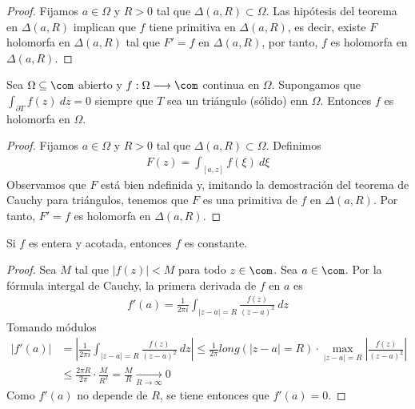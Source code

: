 \begin{proof}
Fijamos $a \in \Omega$ y $R > 0$ tal que $\Delta(a,R) \subset \Omega$. Las hipótesis del teorema en $\Delta(a,R)$ implican que $f$ tiene primitiva en $\Delta(a,R)$, es decir, existe $F$ holomorfa en $\Delta(a,R)$ tal que $F' = f$ en $\Delta(a,R)$, por tanto, $f$ es holomorfa en $\Delta(a,R)$.
\end{proof}

\begin{teo}
Sea $\Omega \subseteq \com$ abierto y $f: \Omega \longrightarrow \com$ continua en $\Omega$. Supongamos que $\int_{\partial T}{f(z) \ dz} = 0$ siempre que $T$ sea un triángulo (sólido) enn $\Omega$. Entonces $f$ es holomorfa en $\Omega$.
\end{teo}

\begin{proof}
Fijamos $a \in \Omega$ y $R > 0$ tal que $\Delta(a,R) \subset \Omega$. Definimos
\begin{align*}
    F(z) = \int_{[a,z]}{f(\xi) \ d\xi}
\end{align*}
Observamos que $F$ está bien ndefinida y, imitando la demostración del teorema de Cauchy para triángulos, tenemos que $F$ es una primitiva de $f$ en $\Delta(a,R)$. Por tanto, $F' = f$ es holomorfa en $\Delta(a,R)$.
\end{proof}

\begin{teo}[de Liouville]
Si $f$ es entera y acotada, entonces $f$ es constante.
\end{teo}

\begin{proof}
Sea $M$ tal que $|f(z)| < M$ para todo $z \in \com$. Sea $a \in \com$. Por la fórmula intergal de Cauchy, la primera derivada de $f$ en $a$ es
\begin{align*}
    f'(a) = \frac{1}{2\pi i}\int_{|z-a| = R}{\frac{f(z)}{(z-a)^2} \ dz}
\end{align*}
Tomando módulos
\begin{align*}
    |f'(a)| &= \left| \frac{1}{2\pi i}\int_{|z-a| = R}{\frac{f(z)}{(z-a)^2} \ dz} \right|  \leq \frac{1}{2\pi} long(|z-a| = R) \cdot \max_{|z-a| = R} \left| \frac{f(z)}{(z-a)^2} \right| \\
    & \leq \frac{2\pi R}{2\pi} \cdot \frac{M}{R^2} = \frac{M}{R} \xrightarrow[R \to \infty]{} 0
\end{align*}
Como $f'(a)$ no depende de $R$, se tiene entonces que $f'(a) = 0$.
\end{proof}

